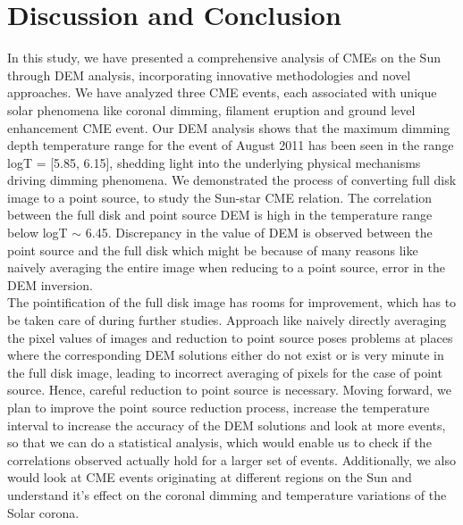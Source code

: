 \section{Discussion and Conclusion}

In this study, we have presented a comprehensive analysis of CMEs on the Sun through DEM analysis, incorporating innovative methodologies and novel approaches. We have analyzed three CME events, each associated with unique solar phenomena like coronal dimming, filament eruption and ground level enhancement CME event. Our DEM analysis shows that the maximum dimming depth temperature range for the event of  August 2011 has been seen in the range logT = [5.85, 6.15], shedding light into the underlying physical mechanisms driving dimming phenomena. We demonstrated the process of converting full disk image to a point source, to study the Sun-star CME relation. The correlation between the full disk and point source DEM is high in the temperature range below logT $\sim$ 6.45. Discrepancy in the value of DEM is observed between the point source and the full disk which might be because of many reasons like naively averaging the entire image when reducing to a point source, error in the DEM inversion.\\

The pointification of the full disk image has rooms for improvement, which has to be taken care of during further studies. Approach like naively directly averaging the pixel values of images and reduction to point source poses problems at places where the corresponding DEM solutions either do not exist or is very minute in the full disk image, leading to incorrect averaging of pixels for the case of point source. Hence, careful reduction to point source is necessary. Moving forward, we plan to improve the point source reduction process, increase the temperature interval to increase the accuracy of the DEM solutions and look at more events, so that we can do a statistical analysis, which would enable us to check if the correlations observed actually hold for a larger set of events. Additionally, we also would look at CME events originating at different regions on the Sun and understand it's effect on the coronal dimming and temperature variations of the Solar corona.

